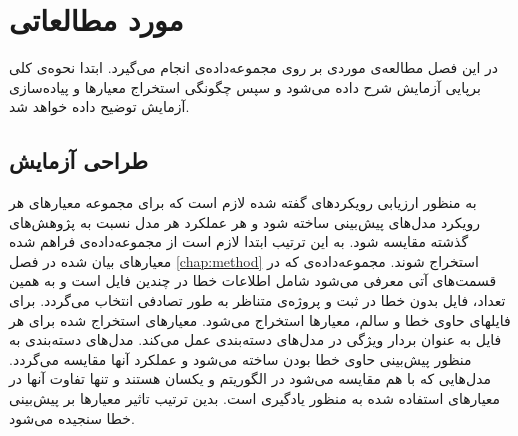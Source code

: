 \chapter{مورد مطالعاتی}
\label{chap:case-study}
در این فصل مطالعه‌ی موردی بر روی مجموعه‌داده‌ی  \cite{Just:2014:DDE:2610384.2628055} انجام می‌گیرد. ابتدا نحوه‌ی کلی برپایی آزمایش شرح داده می‌شود و سپس چگونگی استخراج معیارها و پیاده‌سازی آزمایش توضیح داده خواهد شد. 
\section{طراحی آزمایش}
به منظور ارزیابی رویکردهای گفته شده لازم است که برای مجموعه معیارهای هر رویکرد مدل‌های پیش‌بینی ساخته شود و هر عملکرد هر مدل نسبت به پژوهش‌های گذشته مقایسه شود. به این ترتیب ابتدا لازم است از مجموعه‌داده‌ی فراهم شده معیارهای بیان شده در فصل \ref{chap:method} استخراج شوند. مجموعه‌داده‌ی  که در قسمت‌های آتی معرفی می‌شود شامل اطلاعات خطا در چندین فایل است و به همین تعداد، فایل بدون خطا در ثبت و پروژه‌ی متناظر به طور تصادفی انتخاب می‌گردد. برای فایلهای حاوی خطا و سالم، معیارها استخراج می‌شود. معیارهای استخراج شده  برای هر فایل به عنوان بردار ویژگی در مدل‌های دسته‌بندی عمل می‌کند. مدل‌های دسته‌بندی به منظور پیش‌بینی حاوی خطا بودن ساخته می‌شود و عملکرد آنها مقایسه می‌گردد. مدل‌هایی که با هم مقایسه می‌شود در الگوریتم و  یکسان هستند و تنها تفاوت آنها در معیارهای استفاده شده به منظور یادگیری است. بدین ترتیب تاثیر معیارها بر پیش‌بینی خطا سنجیده می‌شود. 




